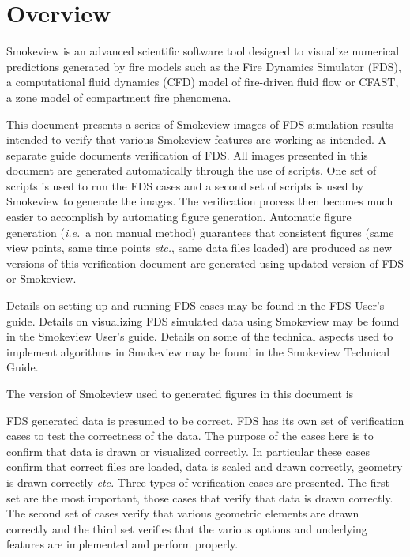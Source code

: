 \documentclass[11pt,twoside]{book}
\begin{document}
\chapter{Overview}
Smokeview is an advanced scientific software tool designed to visualize numerical
predictions generated by fire models such as the Fire Dynamics Simulator (FDS),
a computational fluid dynamics (CFD) model of fire-driven fluid
flow\cite{FDS_Tech_Guide_5} or CFAST, a zone model of compartment fire phenomena\cite{Jones:2004A}.

This document presents a series of Smokeview images of FDS simulation results intended to verify that various Smokeview features are working as intended.  A separate guide\cite{} documents verification of FDS.  All images presented in this document are generated automatically through the use of scripts.  One set of scripts is used to run the FDS cases and a second set of scripts is used by Smokeview to generate the images.  The verification process then becomes much easier to accomplish by automating figure generation.  Automatic figure generation ({\em i.e.}\ a non manual method) guarantees that consistent figures (same view points, same time points {\em etc.}, same data files loaded) are produced as new versions of this verification document are generated using updated version of FDS or Smokeview.

Details on setting up and
running FDS cases may be found in the FDS User's
guide\cite{FDS_Users_Guide_5}.  Details on visualizing FDS simulated data using Smokeview may
be found in the Smokeview User's guide\cite{Smokeview_Users_Guide_5}.  Details on some of the technical
aspects used to implement algorithms in Smokeview may be found in the Smokeview Technical Guide\cite{Smokeview_Tech_Guide_5}.

The version of Smokeview used to generated figures in this document is
{

}

FDS generated data is presumed
to be correct.  FDS has its own set of verification cases to test the correctness of the data.
The purpose of the cases here is to confirm that data is drawn or visualized correctly.
In particular these cases confirm
that correct files are loaded, data is scaled and drawn correctly, geometry is drawn correctly
{\em etc.}   Three types of verification cases are presented. The first set are the most important, those cases that verify that data is drawn correctly.  The second set of
cases verify that various geometric elements are drawn correctly and the third set verifies
that the various options and underlying features are implemented and perform properly.
\end{document}
